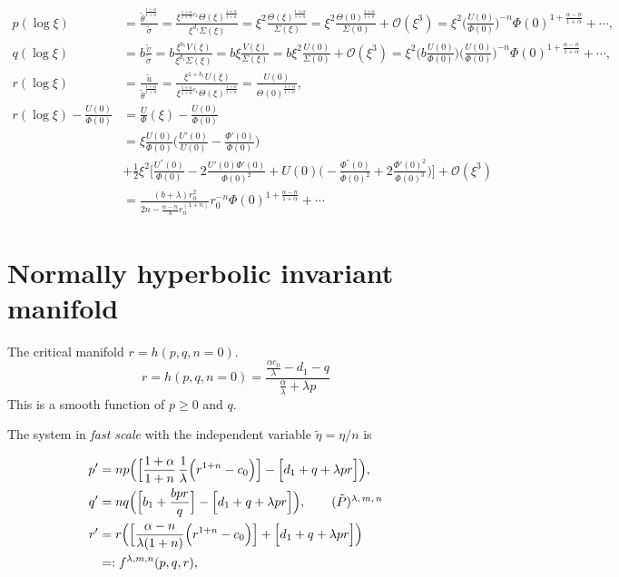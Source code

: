 \documentclass[a4paper,11pt]{article}
\def\tv{{\tilde{v}}}
\def\tth{{\tilde{\theta}}}
\def\ts{{\tilde{\sigma}}}
\def\tu{{\tilde{u}}}
\def\BO{{\mathcal{O}}}
\begin{document}
\begin{align*}
 p(\log\xi) &= \frac{ \tth^{\frac{1+\alpha}{1+n}} }{\ts} = \frac{ \xi^{\frac{1+\alpha}{1+n}c_1} \Theta(\xi)^{\frac{1+\alpha}{1+n}}}{\xi^{d_1} \Sigma(\xi)} = \xi^2\frac{\Theta(\xi)^{\frac{1+\alpha}{1+n}}}{\Sigma(\xi)} = \xi^2\frac{\Theta(0)^{\frac{1+\alpha}{1+n}}}{\Sigma(0)} + \BO(\xi^3) = \xi^2\Big(\frac{U(0)}{\Phi(0)}\Big)^{-n}\Phi(0)^{1+\frac{\alpha-n}{1+\alpha}} + \cdots,\\
 q(\log\xi) &= b\frac{\tv}{\ts} = b\frac{ \xi^{b_1} V(\xi) }{ \xi^{d_1} \Sigma(\xi)} = b\xi\frac{ V(\xi) }{ \Sigma(\xi)} = b\xi^2 \frac{U(0)}{\Sigma(0)}+ \BO(\xi^3) = \xi^2\Big(b\frac{U(0)}{\Phi(0)}\Big)\Big(\frac{U(0)}{\Phi(0)}\Big)^{-n}\Phi(0)^{1+\frac{\alpha-n}{1+\alpha}} + \cdots,\\
 r(\log\xi) &= \frac{\tu}{ \tth^{\frac{1+\alpha}{1+n}} } = \frac{ \xi^{1+b_1}U(\xi) }{ \xi^{\frac{1+\alpha}{1+n}c_1}\Theta(\xi)^{\frac{1+\alpha}{1+n}} } = \frac{ U(0) }{ \Theta(0)^{\frac{1+\alpha}{1+n}} },\\
 r(\log\xi) - \frac{ U(0) }{ \Phi(0)} &= \frac{  U }{ \Phi }(\xi) - \frac{ {U}(0)}{ \Phi(0)}\\
  &= \xi \frac{U(0)}{ \Phi(0)} \bigg(\frac{ U'(0)}{U(0)} - \frac{ \Phi'(0)}{ \Phi(0)}\bigg) \\
  &+ \frac{1}{2}\xi^2\bigg[ \frac{U^{''}(0)}{ \Phi(0)} - 2 \frac{ U'(0)\Phi'(0)}{\Phi(0)^2} + U(0) \bigg(- \frac{ \Phi^{''}(0) }{\Phi(0)^2} + 2 \frac{\Phi'(0)^2}{ \Phi(0)^3 }\bigg) \bigg] + \BO(\xi^3)\\
  &=\frac{ (b+\lambda) r_0^{2} }{ 2n - \frac{\alpha-n}{\lambda}r_0^{(1+n)}} r_0^{-n} \Phi(0)^{1+\frac{\alpha-n}{1+\alpha}} + \cdots
\end{align*}


\section{Normally hyperbolic invariant manifold}
The critical manifold $r=h(p,q,n=0)$.
\begin{equation}
 r=h(p,q,n=0) = \frac{ \frac{\alpha c_0}{\lambda} - d_1 -q }{ \frac{\alpha}{\lambda} + \lambda p}
\end{equation}
This is a smooth function of $p\ge0$ and $q$.

The system in {\it fast scale} with the independent variable $\tilde{\eta} = \eta/n$ is

\begin{align} 
 p^\prime &=np\Big( \Big[\frac{1+\alpha}{1+n}\,\frac{1}{\lambda }\Big(r^{1+n}-c_0\Big)\Big] -\Big[d_1 + q + \lambda pr\Big]\Big), \nonumber \\
 q^\prime &=nq\Big(\Big[b_1 +\frac{bpr}{q}\Big] -\Big[d_1 + q + \lambda pr\Big]\Big), \tag*{($\tilde{P}$)\textsuperscript{$\lambda,m,n$}}\label{eq:pqr_fast} \\%
 r^\prime&=r\Big( \Big[\frac{\alpha-n}{\lambda(1+n)}\Big(r^{1+n}-c_0\Big)\Big]+\Big[d_1 + q + \lambda pr\Big]\Big)\nonumber \\
 &=:f^{\lambda,m,n}(p,q,r), \nonumber
\end{align}
\end{document}

